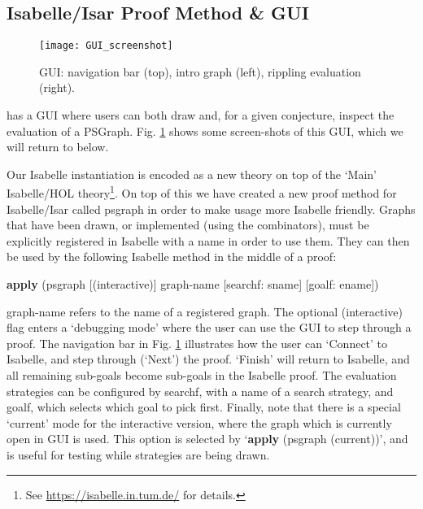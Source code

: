 \documentclass{llncs}
\begin{document}
\beforesection
\subsection{Isabelle/Isar Proof Method \& GUI}
\aftersection

\begin{figure}
\centering
\texttt{[image: GUI\_screenshot]}
\caption{GUI:  navigation bar (top), intro graph (left), rippling evaluation (right).} \label{fig:gui}
\vspace{-5mm}
\end{figure}

\psgraphtool{} has a GUI where users can both draw and, for a given conjecture, 
inspect the evaluation of a PSGraph.  Fig. \ref{fig:gui} shows some screen-shots 
of this GUI, which we will return to below. 

Our Isabelle instantiation is encoded as a new theory on top of the 
`Main' Isabelle/HOL theory\footnote{See \url{https://isabelle.in.tum.de/} for details.}. On top of this we have created a new proof method for Isabelle/Isar called
\textsf{psgraph} in order to make usage more Isabelle friendly. Graphs that
have been drawn, or implemented (using the combinators), must be 
explicitly registered in Isabelle with a name in order to use them.
They can then be used by the following Isabelle method in the middle of a proof:
\begin{center}\sf
\textbf{apply} (psgraph [(interactive)] graph-name [searchf: sname]  [goalf: ename])
\end{center}
\textsf{graph-name} refers to the name of a registered graph.
The optional \textsf{(interactive)} flag enters a `debugging mode' where the user can use the GUI to step through a proof. The navigation bar in Fig. \ref{fig:gui} illustrates how the user can `Connect' to Isabelle, and step through (`Next') the proof. `Finish' will return to Isabelle, and all remaining sub-goals 
become sub-goals in the Isabelle proof. The evaluation strategies can be configured by \textsf{searchf}, with a name of a search strategy, and \textsf{goalf}, which selects
which goal to pick first. Finally, note that there is a special `current' mode for the interactive version, where the graph which is currently open in GUI is used. This option is selected by  `\textsf{\textbf{apply} (psgraph (current))}', and is useful for testing while strategies are being drawn. 

\vspace{10pt}
\end{document}
